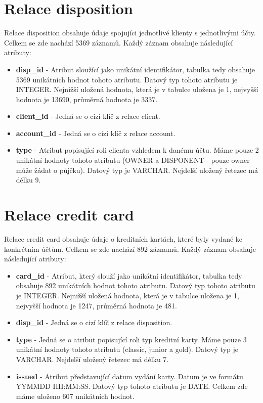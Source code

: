 \documentclass{article}
\begin{document}
\section{Relace disposition}

Relace disposition obsahuje údaje spojujíci jednotlivé klienty s jednotlivými účty. Celkem se zde nachází 5369 záznamů. Každý záznam obsahuje následující atributy:


\begin{itemize}

				
	\item \textbf{disp\_id} - Atribut sloužící jako unikátní identifikátor, tabulka tedy obsahuje 5369 unikátních hodnot tohoto atributu. Datový typ tohoto atributu je INTEGER. Nejnižší uložená hodnota, která je v tabulce uložena je 1, nejvyšší hodnota je 13690, průměrná hodnota je 3337. 
	
	\item \textbf{client\_id} - Jedná se o cizí klíč z relace client.
	
	\item \textbf{account\_id} - Jedná se o cizí klíč z relace account.
	
	\item \textbf{type} - Atribut popisující roli clienta vzhledem k danému účtu.  Máme pouze 2 unikátní hodnoty tohoto atributu (OWNER a DISPONENT - pouze owner může žádat o půjčku). Datový typ je VARCHAR. Nejdelší uložený řetezec má délku 9. 
					
				
\end{itemize}

\section{Relace credit card}

Relace credit card obsahuje údaje o kreditních kartách, které byly vydané ke konkrétním účtům. Celkem se zde nachází 892 záznamů. Každý záznam obsahuje následující atributy:


\begin{itemize}

				
	\item \textbf{card\_id} - Atribut, který slouží jako unikátní identifikátor, tabulka tedy obsahuje 892 unikátních hodnot tohoto atributu. Datový typ tohoto atributu je INTEGER. Nejnižší uložená hodnota, která je v tabulce uložena je 1, nejvyšší hodnota je 1247, průměrná hodnota je 481. 
	
	\item \textbf{disp\_id} - Jedná se o cizí klíč z relace disposition.
	
	\item \textbf{type} - Jedná se o atribut popisující roli typ kreditní karty.  Máme pouze 3 unikátní hodnoty tohoto atributu (classic, junior a gold). Datový typ je VARCHAR. Nejdelší uložený řetezec má délku 7. 
	
	\item \textbf{issued} - Atribut představující datum vydání karty. Datum je ve formátu YYMMDD HH:MM:SS. Datový typ tohoto atributu je DATE. Celkem zde máme uloženo 607 unikátních hodnot.
					
				
\end{itemize}
\end{document}
